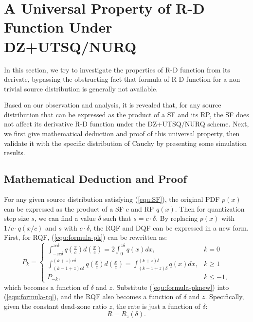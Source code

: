 \documentclass[smallabstract,smallcaptions]{dccpaper}
\begin{document}
\section{A Universal Property of R-D Function Under DZ+UTSQ/NURQ}
\label{sec:property}

In this section, we try to investigate the properties of R-D function from its derivate, bypassing the obstructing fact that formula of R-D function for a non-trivial source distribution is generally not available.

Based on our observation and analysis, it is revealed that, for any source distribution that can be expressed as the product of a SF and its RP, the SF does not affect its derivative R-D function under the DZ+UTSQ/NURQ scheme. Next, we first give mathematical deduction and proof of this universal property, then validate it with the specific distribution of Cauchy by presenting some simulation results.

\subsection{Mathematical Deduction and Proof}

For any given source distribution satisfying (\ref{equ:SF}), the original PDF $p(x)$ can be expressed as the product of a SF $c$ and RP $q(x)$. Then for quantization step size $s$, we can find a value $\delta$ such that $s=c \cdot \delta$. By replacing $p(x)$ with $1/c \cdot q(x/c)$ and $s$ with $c \cdot \delta$, the RQF and DQF can be expressed in a new form. First, for RQF, (\ref{equ:formula-pk}) can be rewritten as:
\begin{equation}\label{equ:formula-pknew}
	P_k =
	\begin{cases}
		\int_{-z c\delta}^{z c\delta} q\left(\frac{x}{c}\right) d\left(\frac{x}{c}\right)
		= 2 \int_{0}^{z \delta} q(x) dx,
		& k=0 \\
		\int_{(k-1+z) c\delta}^{(k+z) c\delta} q\left(\frac{x}{c}\right) d\left(\frac{x}{c}\right)
		=\int_{(k-1+z) \delta}^{(k+z) \delta} q(x) dx,
		& k \ge 1 \\
		P_{-k},
		& k \le -1 ,
	\end{cases}
\end{equation} 
which becomes a function of $\delta$ and $z$. Substitute (\ref{equ:formula-pknew}) into (\ref{equ:formula-rq}), and the RQF also becomes a function of $\delta$ and $z$. Specifically, given the constant dead-zone ratio $z$, the rate is just a function of $\delta$: 
\begin{equation}\label{equ:formula-rqnew}
	R = R_z(\delta).
\end{equation}
\end{document}
